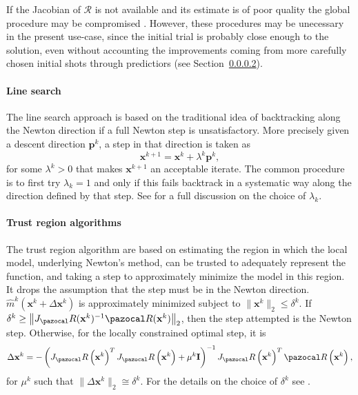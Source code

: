 If the Jacobian of \(\mathcal R\) is not available and its estimate is of poor quality the global procedure may be compromised \citep{kelley_solving_2003}.
However, these procedures may be unecessary in the present use-case, since the initial trial is probably close enough to the solution, even without accounting the improvements coming from more carefully chosen initial shots through predictiors (see Section~\ref{}).

\paragraph{Line search}

The line search approach is based on the traditional idea of backtracking along the Newton direction if a full Newton step is unsatisfactory.
More precisely given a descent direction \(\mathbf p^k\), a step in that direction is taken as
\begin{equation}
  \mathbf x^{k+1} = \mathbf x^k + \lambda^k\mathbf p^k,
\end{equation}
for some \(\lambda^k>0\) that makes \(\mathbf x^{k+1}\) an acceptable iterate.
The common procedure is to first try \(\lambda_k=1\) and only if this fails backtrack in a systematic way along the direction defined by that step.
See \cite{dennis_numerical_1996} for a full discussion on the choice of \(\lambda_k\).

\paragraph{Trust region algorithms}

The trust region algorithm are based on estimating the region in which the local model, underlying Newton's method, can be trusted to adequately represent the function, and taking a step to approximately minimize the model in this region.
It drops the assumption that the step must be in the Newton direction.
\(\hat{m}^k(\mathbf x^k+\Delta \mathbf x^k)\) is approximately minimized subject to \(\|\mathbf x^k\|_{2} \leq \delta^k\).
If \(\delta^k \geq\left\|J_\pazocal R(\mathbf x^k)^{-1} \pazocal R(\mathbf x^k)\right\|_{2}\), then the step attempted is the Newton step.
Otherwise, for the locally constrained optimal step, it is
\begin{equation}
  \Delta \mathbf x^k=-\left(J_\pazocal R\left(\mathbf x^k\right)^{T} J_\pazocal R\left(\mathbf x^k\right)+\mu^k \mathbf I\right)^{-1} J_\pazocal R\left(\mathbf x^k\right)^{T} \pazocal R\left(\mathbf x^k\right),
\end{equation}
for \(\mu^k\) such that \(\|\Delta \mathbf x^k\|_{2} \cong \delta^k\).
For the details on the choice of \(\delta^k\) see \cite{dennis_numerical_1996}.



